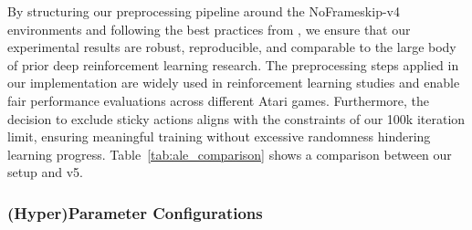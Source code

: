 By structuring our preprocessing pipeline around the NoFrameskip-v4 environments and following the best practices from \cite{machado:revisiting_ale}, we ensure that our experimental results are robust, reproducible, and comparable to the large body of prior deep reinforcement learning research. The preprocessing steps applied in our implementation are widely used in reinforcement learning studies and enable fair performance evaluations across different Atari games. Furthermore, the decision to exclude sticky actions aligns with the constraints of our 100k iteration limit, ensuring meaningful training without excessive randomness hindering learning progress. Table~\ref{tab:ale_comparison} shows a comparison between our setup and v5.

\begin{table}
	\caption{Comparison between our setup based on NoFrameskip-v4 and ALE v5 environments.}
	\label{tab:ale_comparison}
	\centering
\end{table}

\subsubsection{(Hyper)Parameter Configurations}


